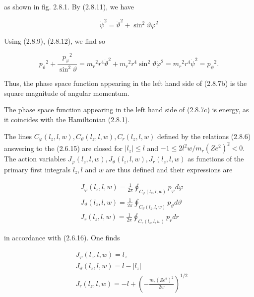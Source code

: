 \documentclass{article}
\begin{document}
as shown in fig. 2.8.1. By (2.8.11), we have
 
\begin{equation*}
\dot{\psi}^{2}=\dot{\vartheta}^{2}+\sin ^{2} \vartheta \dot{\varphi}^{2} \tag{2.8.12}
\end{equation*}
 

Using (2.8.9), (2.8.12), we find so
 
\begin{equation*}
p_{\vartheta}{ }^{2}+\frac{p_{\varphi}{ }^{2}}{\sin ^{2} \vartheta}=m_{r}{ }^{2} r^{4} \dot{\vartheta}^{2}+m_{r}{ }^{2} r^{4} \sin ^{2} \vartheta \dot{\varphi}^{2}=m_{r}{ }^{2} r^{4} \dot{\psi}^{2}=p_{\psi}{ }^{2} . \tag{2.8.13}
\end{equation*}
 

Thus, the phase space function appearing in the left hand side of (2.8.7b) is the square magnitude of angular momentum.

The phase space function appearing in the left hand side of (2.8.7c) is energy, as it coincides with the Hamiltonian (2.8.1).

The lines $C_{\varphi}\left(l_{z}, l, w\right), C_{\vartheta}\left(l_{z}, l, w\right), C_{r}\left(l_{z}, l, w\right)$ defined by the relations (2.8.6) answering to the (2.6.15) are closed for $\left|l_{z}\right| \leq l$ and $-1 \leq 2 l^{2} w / m_{r}\left(Z e^{2}\right)^{2}<0$. The action variables $J_{\varphi}\left(l_{z}, l, w\right), J_{\vartheta}\left(l_{z}, l, w\right), J_{r}\left(l_{z}, l, w\right)$ as functions of the primary first integrals $l_{z}, l$ and $w$ are thus defined and their expressions are
 
\begin{align*}
& J_{\varphi}\left(l_{z}, l, w\right)=\frac{1}{2 \pi} \oint_{C_{\varphi}\left(l_{z}, l, w\right)} p_{\varphi} d \varphi  \tag{2.8.14a}\\
& J_{\vartheta}\left(l_{z}, l, w\right)=\frac{1}{2 \pi} \oint_{C_{\vartheta}\left(l_{z}, l, w\right)} p_{\vartheta} d \vartheta  \tag{2.8.14b}\\
& J_{r}\left(l_{z}, l, w\right)=\frac{1}{2 \pi} \oint_{C_{r}\left(l_{z}, l, w\right)} p_{r} d r \tag{2.8.14c}
\end{align*}
 
in accordance with (2.6.16). One finds
 
\begin{align*}
& J_{\varphi}\left(l_{z}, l, w\right)=l_{z}  \tag{2.8.15a}\\
& J_{\vartheta}\left(l_{z}, l, w\right)=l-\left|l_{z}\right|  \tag{2.8.15b}\\
& J_{r}\left(l_{z}, l, w\right)=-l+\left(-\frac{m_{r}\left(Z e^{2}\right)^{2}}{2 w}\right)^{1 / 2} \tag{2.8.15c}
\end{align*}
 
\end{document}
